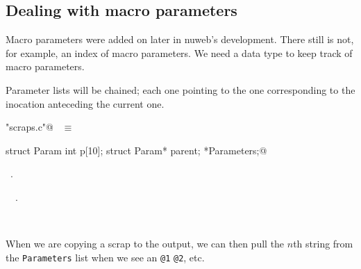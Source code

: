 \documentclass{report}
\begin{document}
\subsection{Dealing with macro parameters}

Macro parameters were added on later in nuweb's development.
There still is not, for example, an index of macro parameters.
We need a data type to keep track of macro parameters.

Parameter lists will be chained; each one pointing to the one corresponding
to the inocation anteceding the current one.

\begin{flushleft} \small
\begin{minipage}{\linewidth} \label{scrap44}
\verb@"scraps.c"@\nobreak\ {\footnotesize {} }$\equiv$
\vspace{-1ex}
\begin{list}{}{} \item
\mbox{}\verb@typedef struct Param { int p[10]; struct Param* parent;} *Parameters;@\\
\mbox{}\verb@@{\NWsep}
\end{list}
\vspace{-1ex}
\footnotesize\addtolength{\baselineskip}{-1ex}
\begin{list}{}{\setlength{\itemsep}{-\parsep}\setlength{\itemindent}{-\leftmargin}}
\item \NWtxtFileDefBy\ .
\end{list}
\vspace{-2ex}
\footnotesize\addtolength{\baselineskip}{-1ex}
\begin{list}{}{\setlength{\itemsep}{-\parsep}\setlength{\itemindent}{-\leftmargin}}
\item \NWtxtIdentsDefed\nobreak\  \verb@Parameters@\nobreak\ .\end{list}
\end{minipage}\\[4ex]
\end{flushleft}
When we are copying a scrap to the output, we can then pull
the $n$th string from the \verb|Parameters| list when we
see an \verb|@1| \verb|@2|, etc.
\end{document}
